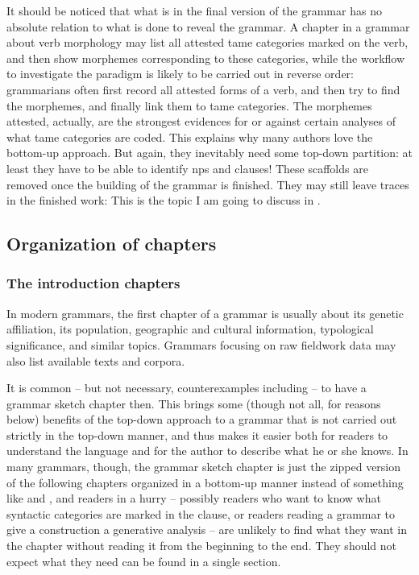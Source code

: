 \documentclass{article}
\begin{document}
It should be noticed that what is in the final version of the grammar 
has no absolute relation to what is done to reveal the grammar.
A chapter in a grammar about verb morphology 
may list all attested \ac{tame} categories marked on the verb,
and then show morphemes corresponding to these categories,
while the workflow to investigate the paradigm 
is likely to be carried out in reverse order:
grammarians often first record all attested forms of a verb,
and then try to find the morphemes,
and finally link them to \ac{tame} categories.
The morphemes attested, actually, 
are the strongest evidences for or against certain analyses of 
what \ac{tame} categories are coded.
This explains why many authors love the bottom-up approach.
But again, they inevitably need some top-down partition:
at least they have to be able to identify \ac{np}s and clauses!
These scaffolds are removed once the building of the grammar is finished.
They may still leave traces in the finished work:
This is the topic I am going to discuss in .

\subsection{Organization of chapters}

\subsubsection{The introduction chapters}\label{sec:introduction-chapter}

In modern grammars, the first chapter of a grammar is usually about 
its genetic affiliation, its population, 
geographic and cultural information,
typological significance, and similar topics.
Grammars focusing on raw fieldwork data 
may also list available texts and corpora.

It is common -- but not necessary, counterexamples including \citet{Grimm2021} 
-- to have a grammar sketch chapter then.
This brings some (though not all, for reasons below) benefits of the top-down approach
to a grammar that is not carried out strictly in the top-down manner,
and thus makes it easier both for readers to understand the language 
and for the author to describe what he or she knows.
In many grammars, though, the grammar sketch chapter is just 
the zipped version of the following chapters organized in a bottom-up manner
instead of something like  and ,
and readers in a hurry 
-- possibly readers who want to know what syntactic categories are marked in the clause,
or readers reading a grammar to give a construction a generative analysis  --
are unlikely to find what they want in the chapter without reading it from the beginning to the end.
They should not expect what they need can be found in a single section.
\end{document}
